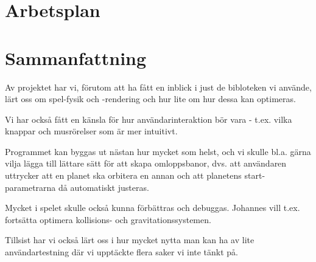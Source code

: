 \documentclass[a4paper, 11pt]{article}
\begin{document}
\subsection{}


\subsection{}


\subsection{}


\section{Arbetsplan}
\label{sec:arbplan}

\subsection{}


\subsection{}


\subsection{}


\section{Sammanfattning}

Av projektet har vi, förutom att ha fått en inblick i just de
bibloteken vi använde, lärt oss om spel-fysik och -rendering
och hur lite om hur dessa kan optimeras.

Vi har också fått en känsla för hur användarinteraktion bör
vara - t.ex. vilka knappar och musrörelser som är mer intuitivt.

Programmet kan byggas ut nästan hur mycket som helst,
och vi skulle bl.a. gärna vilja lägga till lättare sätt
för att skapa omloppsbanor, dvs. att användaren uttrycker att
en planet ska orbitera en annan och att planetens start-parametrarna
då automatiskt justeras.

Mycket i spelet skulle också kunna förbättras och debuggas.
Johannes vill t.ex. fortsätta optimera kollisions- och gravitationssystemen.

Tillsist har vi också lärt oss i hur mycket nytta man
kan ha av lite användartestning där vi upptäckte
flera saker vi inte tänkt på.
\end{document}
